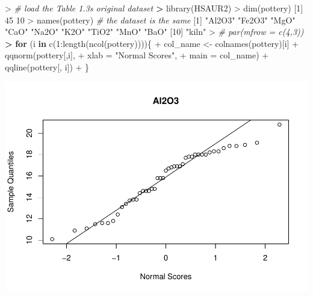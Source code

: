 \documentclass[
]{article}
\newenvironment{Shaded}{\begin{snugshade}}{\end{snugshade}}
\newcommand{\AttributeTok}[1]{\textcolor[rgb]{0.77,0.63,0.00}{#1}}
\newcommand{\CommentTok}[1]{\textcolor[rgb]{0.56,0.35,0.01}{\textit{#1}}}
\newcommand{\ControlFlowTok}[1]{\textcolor[rgb]{0.13,0.29,0.53}{\textbf{#1}}}
\newcommand{\DecValTok}[1]{\textcolor[rgb]{0.00,0.00,0.81}{#1}}
\newcommand{\ErrorTok}[1]{\textcolor[rgb]{0.64,0.00,0.00}{\textbf{#1}}}
\newcommand{\FunctionTok}[1]{\textcolor[rgb]{0.00,0.00,0.00}{#1}}
\newcommand{\NormalTok}[1]{#1}
\newcommand{\OtherTok}[1]{\textcolor[rgb]{0.56,0.35,0.01}{#1}}
\newcommand{\SpecialCharTok}[1]{\textcolor[rgb]{0.00,0.00,0.00}{#1}}
\newcommand{\StringTok}[1]{\textcolor[rgb]{0.31,0.60,0.02}{#1}}
\begin{document}
\begin{Shaded}
\begin{Highlighting}[]
\SpecialCharTok{\textgreater{}} \CommentTok{\# load the Table 1.3\textquotesingle{}s original dataset }
\ErrorTok{\textgreater{}} \FunctionTok{library}\NormalTok{(HSAUR2)}
\SpecialCharTok{\textgreater{}} \FunctionTok{dim}\NormalTok{(pottery)}
\NormalTok{[}\DecValTok{1}\NormalTok{] }\DecValTok{45} \DecValTok{10}
\SpecialCharTok{\textgreater{}} \FunctionTok{names}\NormalTok{(pottery) }\CommentTok{\# the dataset is the same}
\NormalTok{ [}\DecValTok{1}\NormalTok{] }\StringTok{"Al2O3"} \StringTok{"Fe2O3"} \StringTok{"MgO"}   \StringTok{"CaO"}   \StringTok{"Na2O"}  \StringTok{"K2O"}   \StringTok{"TiO2"}  \StringTok{"MnO"}   \StringTok{"BaO"}  
\NormalTok{[}\DecValTok{10}\NormalTok{] }\StringTok{"kiln"} 
\SpecialCharTok{\textgreater{}} \CommentTok{\# par(mfrow = c(4,3))}
\ErrorTok{\textgreater{}} \ControlFlowTok{for}\NormalTok{ (i }\ControlFlowTok{in} \FunctionTok{c}\NormalTok{(}\DecValTok{1}\SpecialCharTok{:}\FunctionTok{length}\NormalTok{(}\FunctionTok{ncol}\NormalTok{(pottery))))\{}
\SpecialCharTok{+}\NormalTok{   col\_name }\OtherTok{\textless{}{-}} \FunctionTok{colnames}\NormalTok{(pottery)[i]}
\SpecialCharTok{+}   \FunctionTok{qqnorm}\NormalTok{(pottery[,i],}
\SpecialCharTok{+}          \AttributeTok{xlab =} \StringTok{"Normal Scores"}\NormalTok{,}
\SpecialCharTok{+}          \AttributeTok{main =}\NormalTok{ col\_name)}
\SpecialCharTok{+}   \FunctionTok{qqline}\NormalTok{(pottery[, i])}
\SpecialCharTok{+}\NormalTok{   \}}
\end{Highlighting}
\end{Shaded}

\includegraphics{hudm6122_hw_01_ChenguangPan_files/figure-latex/unnamed-chunk-3-1.pdf}
\end{document}
